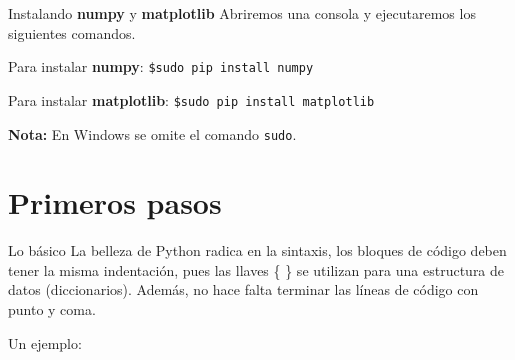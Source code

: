 \documentclass[usenames,dvipsnames]{beamer}
\begin{document}
  \begin{frame}{Instalando \textbf{numpy} y \textbf{matplotlib}}
    Abriremos una consola y ejecutaremos los siguientes comandos.
    \begin{block}{Para instalar \textbf{numpy}:}
      \texttt{\$\hspace{0.3cm}sudo pip install numpy}
    \end{block}
    \vspace*{0.5cm}
    \begin{block}{Para instalar \textbf{matplotlib}:}
      \texttt{\$\hspace{0.3cm}sudo pip install matplotlib}
    \end{block}
    \textbf{Nota:} En Windows se omite el comando \texttt{sudo}.
  \end{frame}

  \section{Primeros pasos}
  \begin{frame}{Lo básico}
    La belleza de Python radica en la sintaxis, los bloques de código deben
    tener la misma indentación, pues las llaves \{ \} se utilizan para una
    estructura de datos (diccionarios). Además, no hace falta terminar las
    líneas de código con punto y coma.

    \begin{block}{Un ejemplo:}

        \\
        \\
        \\

    \end{block}
  \end{frame}
\end{document}
